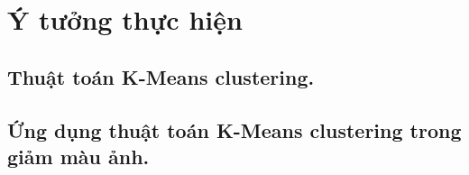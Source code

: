 \section{Ý tưởng thực hiện}
\subsection{Thuật toán K-Means clustering.}
\subsection{Ứng dụng thuật toán K-Means clustering trong giảm màu ảnh.}
